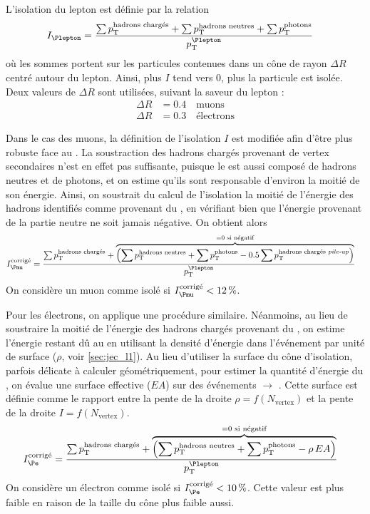 L'isolation du lepton est définie par la relation
\begin{align*}
  I_{\Plepton} &= \frac{\sum{\pt^\text{hadrons chargés}} + \sum{\pt^\text{hadrons neutres}} + \sum{\pt^\text{photons}}}{\pt^{\Plepton}}
\end{align*}
où les sommes portent sur les particules contenues dans un cône de rayon $\Delta R$ centré autour du lepton. Ainsi, plus $I$ tend vers 0, plus la particule est isolée. Deux valeurs de $\Delta R$ sont utilisées, suivant la saveur du lepton :
\begin{align*}
  \Delta R &= \num{0.4} \quad\text{muons}\\
  \Delta R &= \num{0.3} \quad\text{électrons}
\end{align*}

Dans le cas des muons, la définition de l'isolation $I$ est modifiée afin d'être plus robuste face au \pu. La soustraction des hadrons chargés provenant de vertex secondaires n'est en effet pas suffisante, puisque le \pu est aussi composé de hadrons neutres et de photons, et on estime qu'ils sont responsable d'environ la moitié de son énergie. Ainsi, on soustrait du calcul de l'isolation la moitié de l'énergie des hadrons identifiés comme provenant du \pu, en vérifiant bien que l'énergie provenant de la partie neutre ne soit jamais négative. On obtient alors
\begin{align*}
  I_{\Pmu}^\text{corrigé} &= \frac{\sum{\pt^\text{hadrons chargés}} + \overbrace{\left(\sum{\pt^\text{hadrons neutres}} + \sum{\pt^\text{photons}} - \num{0.5} \sum{\pt^\text{hadrons chargés \pu}} \right)}^{= 0 \text{ si négatif}}}{\pt^{\Plepton}}
\end{align*}
On considère un muon comme isolé si $I_{\Pmu}^\text{corrigé} < \SI{12}{\%}$.

\smallskip

Pour les électrons, on applique une procédure similaire. Néanmoins, au lieu de soustraire la moitié de l'énergie des hadrons chargés provenant du \pu, on estime l'énergie restant dû au \pu en utilisant la densité d'énergie dans l'événement par unité de surface ($\rho$, voir \cref{sec:jec_l1}). Au lieu d'utiliser la surface du cône d'isolation, parfois délicate à calculer géométriquement, pour estimer la quantité d'énergie du \pu, on évalue une surface effective ($EA$) sur des événements \PZ $\rightarrow$ \Pelectron{}\Ppositron. Cette surface est définie comme le rapport entre la pente de la droite $\rho = f(N_{\text{vertex}})$ et la pente de la droite $I = f(N_\text{vertex})$.
\begin{align*}
  I_{\Pe}^\text{corrigé} &= \frac{\sum{\pt^\text{hadrons chargés}} + \overbrace{\left(\sum{\pt^\text{hadrons neutres}} + \sum{\pt^\text{photons}} - \rho\,EA \right)}^{= 0 \text{ si négatif}}}{\pt^{\Plepton}}
\end{align*}
On considère un électron comme isolé si $I_{\Pe}^\text{corrigé} < \SI{10}{\%}$. Cette valeur est plus faible en raison de la taille du cône plus faible aussi.

